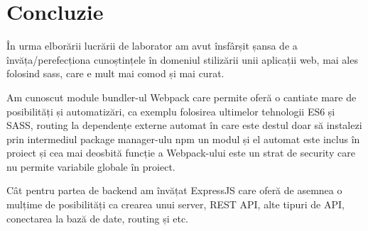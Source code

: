 \section*{Concluzie}

În urma elborării lucrării de laborator am avut însfârșit șansa de a învăța/perefecționa cunoștințele în domeniul stilizării unii aplicații web, mai ales folosind sass, care e mult mai comod și mai curat. \par
Am cunoscut module bundler-ul Webpack \cite{webpack} care permite oferă o cantiate mare de posibilități și automatizări, ca exemplu folosirea ultimelor tehnologii ES6 și SASS, routing la dependențe externe automat în care este destul doar să instalezi prin intermediul package manager-ulu npm un modul și el automat este inclus în proiect și cea mai deosbită funcție a Webpack-ului este un strat de security care nu permite variabile globale în proiect. \par
Cât pentru partea de backend am învățat ExpressJS\cite{expressjs} care oferă de asemnea o mulțime de posibilități ca crearea unui server, REST API, alte tipuri de API, conectarea la bază de date, routing și etc.




\clearpage